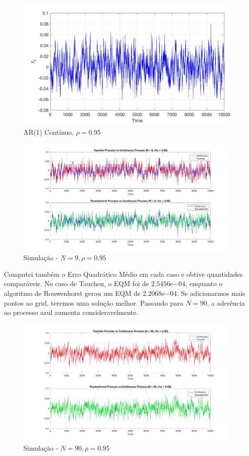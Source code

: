 \documentclass[10pt]{article}
\begin{document}
\begin{figure}[h!]
	\centering
	\includegraphics[scale=0.3]{cont_path.jpg}
	\caption[h!]{AR(1) Contínuo, $\rho = 0.95$}
\end{figure}

\begin{figure}[h!]
	\centering
	\includegraphics[scale = 0.22]{tauchen-vs-rou-n9.jpg}
	\caption{Simulação - $N = 9, \rho = 0.95$}
\end{figure}

Computei também o Erro Quadrático Médio em cada caso e obtive quantidades comparáveis. No caso de Tauchen, o EQM foi de $2.5456\mathrm{e}{-04}$, enquanto o algoritmo de Rouwenhorst gerou um EQM de $2.2068\mathrm{e}{-04}$. Se adicionarmos mais pontos ao grid, teremos uma solução melhor. Passando para $N = 90$, a aderência ao processo azul aumenta consideravelmente.
\begin{figure}[h!]
	\centering
	\includegraphics[scale = 0.22]{tauchen-vs-rou-n90}
	\caption{Simulação - $N = 90, \rho = 0.95$}
\end{figure}
\end{document}
